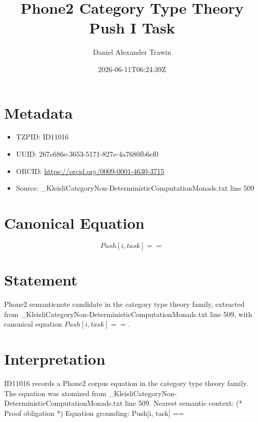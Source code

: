 \documentclass[11pt]{article}
\title{Phone2 Category Type Theory Push I Task}
\author{Daniel Alexander Trawin}
\date{2026-06-11T06:24:39Z}
\begin{document}
\maketitle
\section*{Metadata}
\begin{itemize}
\item TZPID: ID11016
\item UUID: 267e686e-3653-5171-827e-4a7680fb6ef0
\item ORCID: \url{https://orcid.org/0009-0001-4630-3715}
\item Source: _KleisliCategoryNon-DeterministicComputationMonads.txt line 509
\end{itemize}
\section*{Canonical Equation}
\[
Push[i, task] ==
\]
\section*{Statement}
Phone2 semanticnote candidate in the category type theory family, extracted from _KleisliCategoryNon-DeterministicComputationMonads.txt line 509, with canonical equation $Push[i, task] ==$.
\section*{Interpretation}
ID11016 records a Phone2 corpus equation in the category type theory family. The equation was atomized from _KleisliCategoryNon-DeterministicComputationMonads.txt line 509. Nearest semantic context: (* Proof obligation *) Equation grounding: Push[i, task] ==
\end{document}
